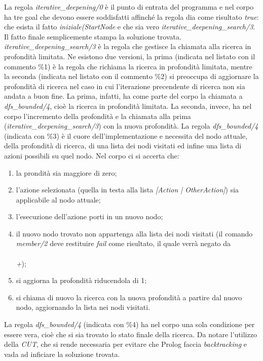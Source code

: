 \documentclass[12pt]{report}
\begin{document}
La regola \emph{iterative\_deepening/0} \`e il punto di entrata del programma e nel corpo ha tre goal che devono essere soddisfatti affinché la regola dia come risultato \emph{true}: che esista il fatto \emph{iniziale(StartNode} e che sia vero \emph{iterative\_deepening\_search/3}. Il fatto finale semplicemente stampa la soluzione trovata.
\emph{iterative\_deepening\_search/3} \`e la regola che gestisce la chiamata alla ricerca in profondit\`a limitata. Ne esistono due versioni, la prima (indicata nel listato con il commento \%1) \`e la regola che richiama la ricerca in profondit\`a limitata, mentre la seconda (indicata nel listato con il commento \%2) si preoccupa di aggiornare la profondit\`a di ricerca nel caso in cui l'iterazione precendente di ricerca non sia andata a buon fine.
La prima, infatti, ha come parte del corpo la chiamata a \emph{dfs\_bounded/4}, cioè la ricerca in profondit\`a limitata.
La seconda, invece, ha nel corpo l'incremento della profondit\`a e la chiamata alla prima (\emph{iterative\_deepening\_search/3}) con la nuova profondit\`a.
La regola \emph{dfs\_bounded/4} (indicata con \%3) è il cuore dell'implementazione e necessita del nodo attuale, della profondit\`a di ricerca, di una lista dei nodi visitati ed infine una lista di azioni possibili su quel nodo. Nel corpo ci si accerta che:

\begin{enumerate}
\item la prondit\`a sia maggiore di zero;
\item l'azione selezionata (quella in testa alla lista \emph{[Action | OtherAction]}) sia applicabile al nodo attuale;
\item l'esecuzione dell'azione porti in un nuovo nodo;
\item il nuovo nodo trovato non appartenga alla lista dei nodi visitati (il comando \emph{member/2} deve restituire \emph{fail} come risultato, il quale verrà negato da \emph{\\\\+});
\item si aggiorna la profondit\`a riducendola di 1;
\item si chiama di nuovo la ricerca con la nuova profondit\`a a partire dal nuovo nodo, aggiornando la lista nei nodi visitati.
\end{enumerate}

La regola \emph{dfs\_bounded/4} (indicata con \%4) ha nel corpo una sola condizione per essere vera, cioè che si sia trovato lo stato finale della ricerca. Da notare l'utilizzo della \emph{CUT}, che si rende necessaria per evitare che Prolog faccia \emph{backtracking} e vada ad inficiare la soluzione trovata.
\end{document}
